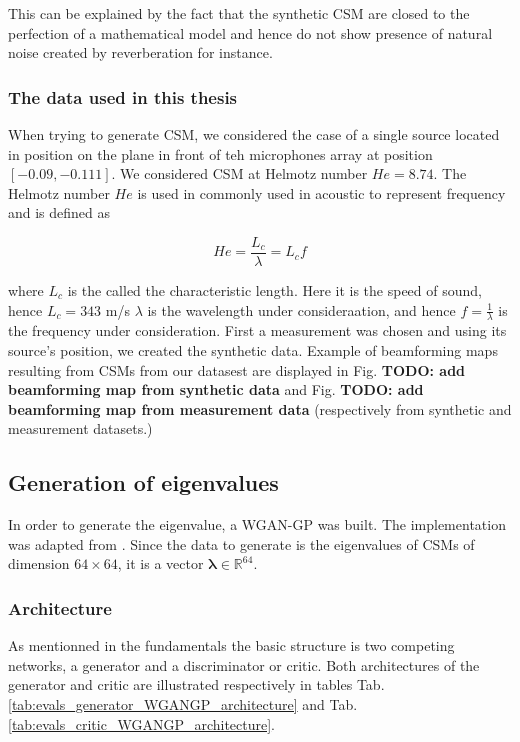 \documentclass{article}
\begin{document}
This can be explained by the fact that the synthetic CSM are closed to the perfection of a mathematical model and hence do not show presence of natural noise created by reverberation for instance.

\subsubsection{The data used in this thesis}

When trying to generate CSM, we considered the case of a single source located in position on the plane in front of teh microphones array at position $[-0.09,-0.111]$. We considered CSM at Helmotz number $He = 8.74$. The Helmotz number $He$  is used in commonly used in acoustic to represent frequency and is defined as

\begin{equation}
    He = \frac{L_c}{\lambda} = L_c f 
\end{equation}

where $L_c$ is the called the characteristic length. Here it is the speed of sound, hence $L_c = 343$ m/s $\lambda$ is the wavelength under consideraation, and hence $f = \frac{1}{\lambda}$ is the frequency under consideration. First a measurement was chosen and using its source's position, we created the synthetic data. Example of beamforming maps resulting from CSMs from our datasest are displayed in Fig. \textbf{TODO: add beamforming map from synthetic data} and Fig. \textbf{TODO: add beamforming map from measurement data} (respectively from synthetic and measurement datasets.)


\subsection{Generation of eigenvalues}

In order to generate the eigenvalue, a WGAN-GP was built. The implementation was adapted from \cite{nain2020wgangp}. Since the data to generate is the eigenvalues of CSMs of dimension $64 \times 64$, it is a vector $\mathbf{\lambda} \in \mathbb{R}^{64}$.

\subsubsection{Architecture}

As mentionned in the fundamentals the basic structure is two competing networks, a generator and a discriminator or critic. Both architectures of the generator and critic are illustrated respectively in tables Tab.\ref{tab:evals_generator_WGANGP_architecture} and Tab.\ref{tab:evals_critic_WGANGP_architecture}.
\end{document}
